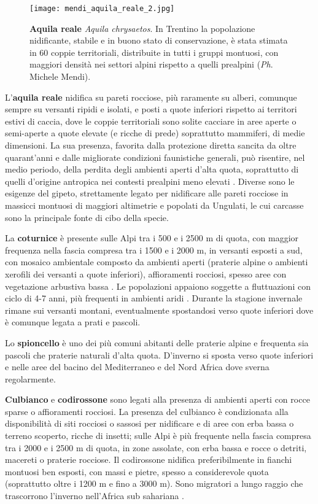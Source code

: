 \documentclass[10pt,twoside,openany,x11names,svgnames,italian,a5paper,dvipsnames,table]{memoir}
\newcommand{\ph}{\emph{Ph}. }
\begin{document}
\begin{wrapfigure}[]{r}{.6\columnwidth}
\centering
  \texttt{[image: mendi\_aquila\_reale\_2.jpg]}
  \caption*{\textbf{Aquila reale} \emph{Aquila chrysaetos}. In Trentino la popolazione nidificante, stabile e in buono stato di conservazione, è stata stimata in 60 coppie territoriali, distribuite in tutti i gruppi montuosi, con maggiori densità nei settori alpini rispetto a quelli prealpini (\ph Michele Mendi).}
\end{wrapfigure}L’\textbf{aquila reale} nidifica su pareti rocciose, più raramente su alberi, comunque sempre su versanti ripidi e isolati, e posti a quote inferiori rispetto ai territori estivi di caccia, dove le coppie territoriali sono solite cacciare in aree aperte o semi-aperte a quote elevate (e ricche di prede) soprattutto mammiferi, di medie dimensioni. La sua presenza, favorita dalla protezione diretta sancita da oltre quarant’anni e dalle migliorate condizioni faunistiche generali, può risentire, nel medio periodo, della perdita degli ambienti aperti d’alta quota, soprattutto di quelli d’origine antropica nei contesti prealpini meno elevati \cite{Pedrini01} \cite{Pedrini01b} \cite{Pedrini02}. Diverse sono le esigenze del gipeto, strettamente legato per nidificare alle pareti rocciose in massicci montuosi di maggiori altimetrie e popolati da Ungulati, le cui carcasse sono la principale fonte di cibo della specie.


La \textbf{coturnice} è presente sulle Alpi tra i 500 e i 2500 m di quota, con maggior frequenza nella fascia compresa tra i 1500 e i 2000 m, in versanti esposti a sud, con mosaico ambientale composto da ambienti aperti (praterie alpine o ambienti xerofili dei versanti a quote inferiori), affioramenti rocciosi, spesso aree con vegetazione arbustiva bassa \cite{Pedrini05}. Le popolazioni appaiono soggette a fluttuazioni con ciclo di 4-7 anni, più frequenti in ambienti aridi \cite{Cattadori99} \cite{Cattadori03}. Durante la stagione invernale rimane sui versanti montani, eventualmente spostandosi verso quote inferiori dove è comunque legata a prati e pascoli.


Lo \textbf{spioncello} è uno dei più comuni abitanti delle praterie alpine e frequenta sia pascoli che praterie naturali d’alta quota. D’inverno si sposta verso quote inferiori e nelle aree del bacino del Mediterraneo e del Nord Africa dove sverna regolarmente.


\textbf{Culbianco} e \textbf{codirossone} sono legati alla presenza di ambienti aperti con rocce sparse o affioramenti rocciosi. La presenza del culbianco è condizionata alla disponibilità di siti rocciosi o sassosi per nidificare e di aree con erba bassa o terreno scoperto, ricche di insetti; sulle Alpi è più frequente nella fascia compresa tra i 2000 e i 2500 m di quota, in zone assolate, con erba bassa e rocce o detriti, macereti o praterie rocciose. Il codirossone nidifica preferibilmente in fianchi montuosi ben esposti, con massi e pietre, spesso a considerevole quota (soprattutto oltre i 1200 m e fino a 3000 m). Sono migratori a lungo raggio che trascorrono l’inverno nell’Africa sub sahariana \cite{Brichetti07}.
\end{document}
